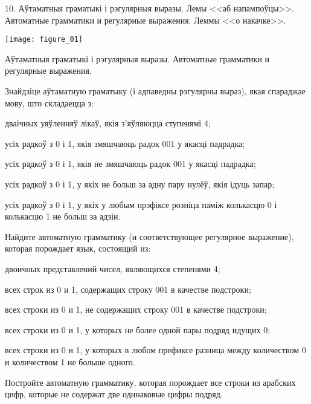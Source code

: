 \documentclass[12pt, a4paper]{article}
\begin{document}
\biLangHeader
{10. Аўтаматныя граматыкі і рэгулярныя выразы. Лемы <<аб напампоўцы>>.}
{Автоматные грамматики и регулярные выражения. Леммы <<о накачке>>.}

\begin{center}
    \texttt{[image: figure\_01]}
\end{center}    

\biLangHeader
{Аўтаматныя граматыкі і рэгулярныя выразы.}
{Автоматные грамматики и регулярные выражения.}

\begin{problemList}

\problemItemSimple
{%
Знайдзіце аўтаматную граматыку (і адпаведны рэгулярны выраз),
якая спараджае мову, што складаецца з:
\begin{belarusianEnumerate}
    \item дваічных уяўленняў лікаў, якія з'яўляюцца ступенямі 4;
    \item усіх радкоў з 0 і 1, якія змяшчаюць радок 001 у якасці падрадка;
    \item усіх радкоў з 0 і 1, якія не змяшчаюць радок 001 у якасці падрадка;
    \item усіх радкоў з 0 і 1, у якіх не больш за адну пару нулёў, якія ідуць запар;
    \item усіх радкоў з 0 і 1, у якіх у любым прэфіксе розніца паміж колькасцю 0 і колькасцю 1 не больш за адзін.
\end{belarusianEnumerate}
}
{%
Найдите автоматную грамматику (и соответствующее регулярное выражение),
которая порождает язык, состоящий из:
\begin{russianEnumerate}
    \item двоичных представлений чисел, являющихся степенями 4;
    \item всех строк из 0 и 1, содержащих строку 001 в качестве подстроки;
    \item всех строки из 0 и 1, не содержащих строку 001 в качестве подстроки;
    \item всех строки из 0 и 1, у которых не более одной пары подряд идущих 0;
    \item всех строки из 0 и 1, у которых в любом префиксе разница между количеством 0 и количеством 1 не больше одного.
\end{russianEnumerate}
}

\bigskip

{Постройте автоматную грамматику, которая порождает все строки из арабских цифр,
которые не содержат две одинаковые цифры подряд.}


\end{problemList}
\end{document}
